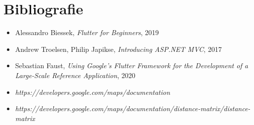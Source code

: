 \chapter*{Bibliografie} 

\begin{itemize}
    \item Alessandro Biessek, \textit{Flutter for Beginners}, 2019
    \item Andrew Troelsen, Philip Japikse, \textit{Introducing ASP.NET MVC}, 2017
    \item Sebastian Faust, \textit{Using Google's Flutter Framework for the Development of a Large-Scale Reference Application}, 2020
    \item \textit{https://developers.google.com/maps/documentation}
    \item \textit{https://developers.google.com/maps/documentation/distance-matrix/distance-matrix}
\end{itemize}